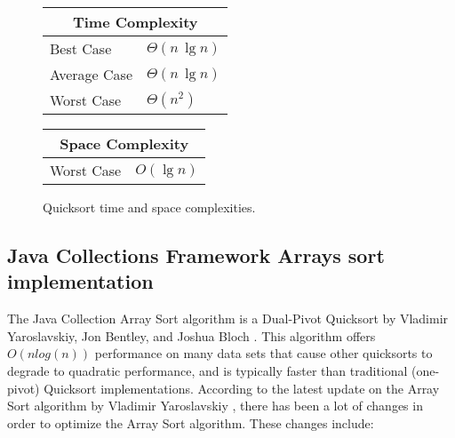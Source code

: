 \begin{figure}[!ht]
    \centering
    \begin{tabular}{l|l}
    \multicolumn{2}{c}{\textbf{Time Complexity}} \\
    \hline
    Best Case    & $\Theta(n \, \lg n)$ \\
    Average Case & $\Theta(n \, \lg n)$ \\
    Worst Case   & $\Theta(n^2)$ \\
    \end{tabular}
    \quad\quad
    \begin{tabular}{l|l}
    \multicolumn{2}{c}{\textbf{Space Complexity}} \\
    \hline
    Worst Case   & $O(\lg n)$
    \end{tabular}
    
    \caption{Quicksort time\cite{clrs2009} and space complexities\cite{big-o}.}
    \label{fig:quicksort}
\end{figure}

\subsection{Java Collections Framework Arrays sort implementation}
The Java Collection Array Sort algorithm is a Dual-Pivot Quicksort by Vladimir Yaroslavskiy, Jon Bentley, and Joshua Bloch \cite{JavaCollectionFrameworkArraysSort}. This algorithm offers $O(nlog(n))$ performance on many data sets that cause other quicksorts to degrade to quadratic performance, and is typically faster than traditional (one-pivot) Quicksort implementations. According to the latest update on the Array Sort algorithm by Vladimir Yaroslavskiy \cite{VladimirYaroslavskiy}, there has been a lot of changes in order to optimize the Array Sort algorithm. These changes include: 

